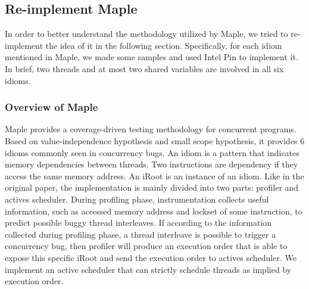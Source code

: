 \documentclass[twocolumn]{article}
\begin{document}
\subsection{Re-implement Maple}
In order to better understand the methodology utilized by Maple, we tried to re-implement the idea of it in the following section. Specifically, for each idiom mentioned in Maple, we made some samples and used Intel Pin to implement it. In brief, two threads and at most two shared variables are involved in all six idioms. 

\subsubsection{Overview of Maple}
Maple provides a coverage-driven testing methodology for concurrent programs. Based on value-independence hypothesis and small scope hypothesis, it provides 6 idioms commonly seen in concurrency bugs. An idiom is a pattern that indicates memory dependencies between threads. Two instructions are dependency if they access the same memory address. An iRoot is an instance of an idiom. Like in the original paper, the implementation is mainly divided into two parts: profiler and actives scheduler. During profiling phase, instrumentation collects useful information, such as accessed memory address and lockset of some instruction, to predict possible buggy thread interleaves. If according to the information collected during profiling phase, a thread interleave is possible to trigger a concurrency bug, then profiler will produce an execution order that is able to expose this specific iRoot and send the execution order to actives scheduler. We implement an active scheduler that can strictly schedule threads as implied by execution order. 
\end{document}
